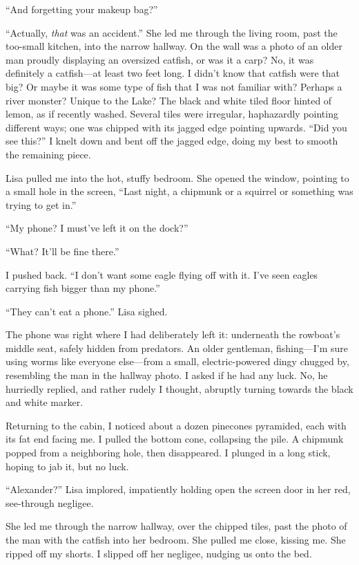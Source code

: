 ``And forgetting your makeup bag?''

``Actually, \emph{that} was an accident.'' She led me through the living
room, past the too-small kitchen, into the narrow hallway. On the wall
was a photo of an older man proudly displaying an oversized catfish, or
was it a carp? No, it was definitely a catfish---at least two feet long.
I didn't know that catfish were that big? Or maybe it was some type of
fish that I was not familiar with? Perhaps a river monster? Unique to
the Lake? The black and white tiled floor hinted of lemon, as if
recently washed. Several tiles were irregular, haphazardly pointing
different ways; one was chipped with its jagged edge pointing upwards.
``Did you see this?'' I knelt down and bent off the jagged edge, doing
my best to smooth the remaining piece.

Lisa pulled me into the hot, stuffy bedroom. She opened the window,
pointing to a small hole in the screen, ``Last night, a chipmunk or a
squirrel or something was trying to get in.''

``My phone? I must've left it on the dock?''

``What? It'll be fine there.''

I pushed back. ``I don't want some eagle flying off with it. I've seen
eagles carrying fish bigger than my phone.''

``They can't eat a phone.'' Lisa sighed.

The phone was right where I had deliberately left it: underneath the
rowboat's middle seat, safely hidden from predators. An older gentleman,
fishing---I'm sure using worms like everyone else---from a small,
electric-powered dingy chugged by, resembling the man in the hallway
photo. I asked if he had any luck. No, he hurriedly replied, and rather
rudely I thought, abruptly turning towards the black and white marker.

Returning to the cabin, I noticed about a dozen pinecones pyramided,
each with its fat end facing me. I pulled the bottom cone, collapsing
the pile. A chipmunk popped from a neighboring hole, then disappeared. I
plunged in a long stick, hoping to jab it, but no luck.

``Alexander?'' Lisa implored, impatiently holding open the screen door
in her red, see-through negligee.

She led me through the narrow hallway, over the chipped tiles, past the
photo of the man with the catfish into her bedroom. She pulled me close,
kissing me. She ripped off my shorts. I slipped off her negligee,
nudging us onto the bed.

